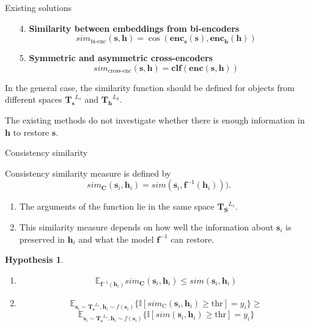 \documentclass{beamer}
\newtheorem{hyp}{Hypothesis}
\begin{document}
\begin{frame}{Existing solutions}

\begin{enumerate}
    \item[4.] \textbf{Similarity between embeddings from bi-encoders} \[sim_\text{bi-enc}(\mathbf{s}, \mathbf{h}) = \cos (\mathbf{enc_s}(\mathbf{s}), \mathbf{enc_h}(\mathbf{h}))\]
    \item[5.] \textbf{Symmetric and asymmetric cross-encoders} \[sim_\text{cross-enc}(\mathbf{s}, \mathbf{h}) = \mathbf{clf}(\mathbf{enc}(\mathbf{s}, \mathbf{h}))\]
\end{enumerate}

In the general case, the similarity function should be defined for objects from different spaces $\mathbf{T_s}^{L_s}$ and $\mathbf{T_h}^{L_h}$. 

The existing methods do not investigate whether there is enough information in $\mathbf{h}$ to restore $\mathbf{s}$.

\end{frame}

\begin{frame}{Consistency similarity}


Consistency similarity measure is defined by
\[{sim}_{\mathbf{C}} (\mathbf{s}_i, \mathbf{h}_i) = {sim}(\mathbf{s}_i, \mathbf{f}^{-1}(\mathbf{h}_i))).\]

\begin{enumerate}
    \item The arguments of the function lie in the same space $\mathbf{T_S}^{L_s}$.
    \item This similarity measure depends on how well the information about $\mathbf{s}_i$ is preserved in $\mathbf{h}_i$ and what the model $\mathbf{f}^{-1}$ can restore.
\end{enumerate}

\begin{hyp}
\begin{enumerate}
    \item \[\mathbb{E}_{\mathbf{f}^{-1}(\mathbf{h}_i)} {sim}_{\mathbf{C}} (\mathbf{s}_i, \mathbf{h}_i) \le{sim} (\mathbf{s}_i, \mathbf{h}_i) \]
    \item \[\mathbb{E}_{\mathbf{s}_i \sim \mathbf{T_s}^{L_s}, \mathbf{h}_i \sim f(\mathbf{s}_i)} \{\mathbb{I}[sim_\text{C}(\mathbf{s}_i, \mathbf{h}_i) \ge \text{thr}] = y_i \} \ge \]
    \[\mathbb{E}_{\mathbf{s}_i \sim \mathbf{T_s}^{L_s}, \mathbf{h}_i \sim f(\mathbf{s}_i)} \{\mathbb{I}[sim(\mathbf{s}_i, \mathbf{h}_i) \ge \text{thr}] = y_i \}\]
\end{enumerate}    
\end{hyp}

\end{frame}
\end{document}

